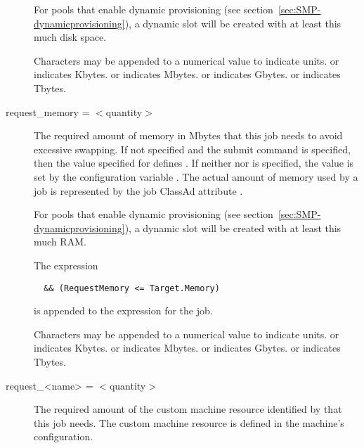 \begin{description}
For pools that enable
dynamic  provisioning
(see section~\ref{sec:SMP-dynamicprovisioning}),
a dynamic slot will be created with at least this much disk space.

Characters may be appended to a numerical value to indicate units. 
 or  indicates Kbytes.
 or  indicates Mbytes.
 or  indicates Gbytes.
 or  indicates Tbytes.


\label{man-condor-submit-request-memory}
\item[request\_memory = $<$quantity$>$] 
The required amount of memory in Mbytes that this job needs
to avoid excessive swapping.
If not specified and the submit command  is specified, 
then the value specified
for  defines .
If neither  nor  is specified,
the value is set by the configuration variable
.
The actual amount of memory used by a job is represented by the
job ClassAd attribute .

For pools that enable
dynamic  provisioning
(see section~\ref{sec:SMP-dynamicprovisioning}),
a dynamic slot will be created with at least this much RAM.

The expression
\begin{verbatim}
  && (RequestMemory <= Target.Memory) 
\end{verbatim}
is appended to the  expression for the job.

Characters may be appended to a numerical value to indicate units. 
 or  indicates Kbytes.
 or  indicates Mbytes.
 or  indicates Gbytes.
 or  indicates Tbytes.


\label{man-condor-submit-request-name}
\item[request\_<name> = $<$quantity$>$] 
The required amount of the custom machine resource 
identified by  that this job needs.
The custom machine resource is defined in the machine's configuration.



\end{description}
